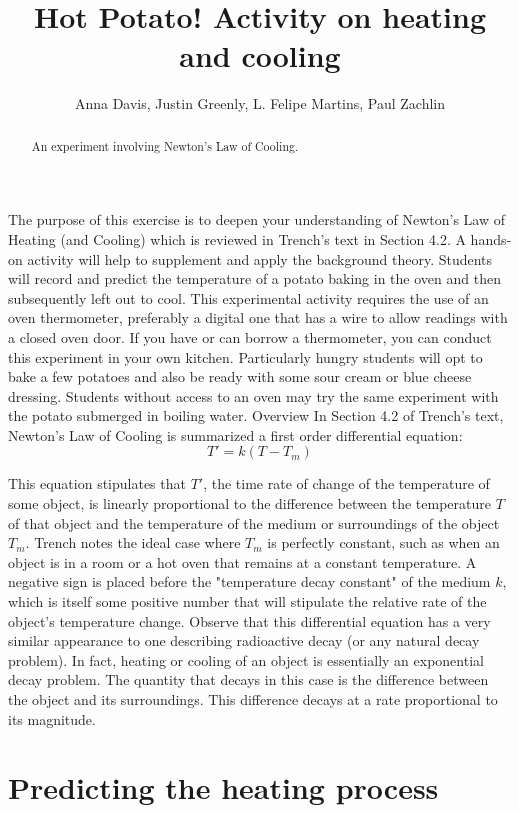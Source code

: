 \documentclass{ximera}
\title{Hot Potato! Activity on heating and cooling}
\author{Anna Davis, Justin Greenly, L. Felipe Martins, Paul Zachlin}
\begin{document}
\begin{abstract}
An experiment involving Newton's Law of Cooling.
\end{abstract}

\maketitle

The purpose of this exercise is to deepen your understanding of Newton's Law of Heating (and Cooling) which is reviewed in Trench's text in Section 4.2.  A hands-on activity will help to supplement and apply the background theory.  Students will record and predict the temperature of a potato baking in the oven and then subsequently left out to cool.  This experimental activity requires the use of an oven thermometer, preferably a digital one that has a wire to allow readings with a closed oven door.  If you have or can borrow a thermometer, you can conduct this experiment in your own kitchen.  Particularly hungry students will opt to bake a few potatoes and also be ready with some sour cream or blue cheese dressing.  Students without access to an oven may try the same experiment with the potato submerged in boiling water.
Overview
In Section 4.2 of Trench's text, Newton's Law of Cooling is summarized a first order differential equation:
\[
T'=k(T-T_m)
\]
 
This equation stipulates that $T'$, the time rate of change of the temperature of some object, is linearly proportional to the difference between the temperature  $T$ of that object and the temperature of the medium or surroundings of the object $T_m$.  Trench notes the ideal case where  $T_m$ is perfectly constant, such as when an object is in a room or a hot oven that remains at a constant temperature.  A negative sign is placed before the "temperature decay constant" of the medium $k$, which is itself some positive number that will stipulate the relative rate of the object's temperature change.  Observe that this differential equation has a very similar appearance to one describing radioactive decay (or any natural decay problem).  In fact, heating or cooling of an object is essentially an exponential decay problem.  The quantity that decays in this case is the difference between the object and its surroundings.  This difference decays at a rate proportional to its magnitude.
 
\section*{Predicting the heating process}
\end{document}
